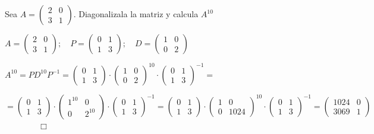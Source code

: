 \begin{miejercicio}
	Sea $A=\left( \begin{matrix} 2&0\\3&1 \end{matrix} \right)$. Diagonalizala la matriz y calcula $A^{10}$
\end{miejercicio}



$A=\left( \begin{matrix} 2&0\\3&1 \end{matrix} \right); \quad P=\left( \begin{matrix} 0&1\\1&3 \end{matrix} \right) ; \quad D=\left( \begin{matrix} 1&0\\0&2 \end{matrix} \right)$

$A^{10}=PD^{10}P^{-1}=\left( \begin{matrix} 0&1\\1&3 \end{matrix} \right) \cdot \left( \begin{matrix} 1&0\\0&2 \end{matrix} \right)^{10}\cdot \left( \begin{matrix} 0&1\\1&3 \end{matrix} \right)^{-1}=$

\noindent $=\left( \begin{matrix} 0&1\\1&3 \end{matrix} \right) \cdot \left( \begin{matrix} 1^{10}&0\\0&2^{10} \end{matrix} \right)\cdot \left( \begin{matrix} 0&1\\1&3 \end{matrix} \right)^{-1}=
\left( \begin{matrix} 0&1\\1&3 \end{matrix} \right) \cdot \left( \begin{matrix} 1&0\\0&1024 \end{matrix} \right)^{10}\cdot \left( \begin{matrix} 0&1\\1&3 \end{matrix} \right)^{-1}=\left( \begin{matrix} 1024&0\\3069&1 \end{matrix} \right)$$\qquad \qquad \Box$
	

